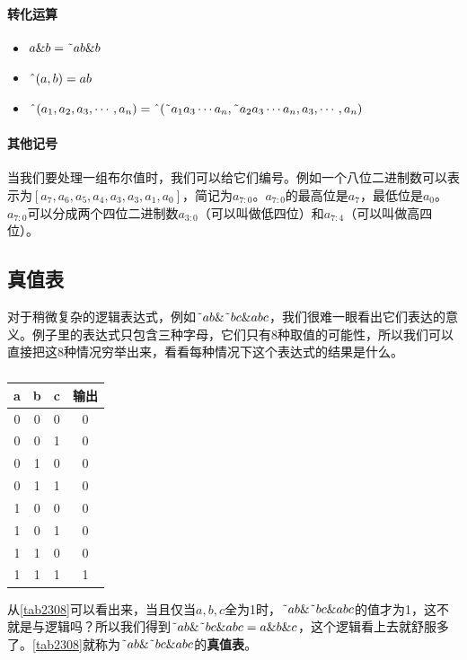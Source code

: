 \paragraph*{转化运算}
\begin{itemize}
\item $a\&b=\textrm{\~{}} ab\&b$
\item $\textrm{\^{}}(a,b)=ab$
\item $\textrm{\^{}}(a_1,a_2,a_3,\cdots,a_n)=\textrm{\^{}}(\textrm{\~{}} a_1a_3\cdots a_n,\textrm{\~{}} a_2a_3\cdots a_n,a_3,\cdots,a_n)$
\end{itemize}

\paragraph*{其他记号}
当我们要处理一组布尔值时，我们可以给它们编号。例如一个八位二进制数可以表示为$[a_7,a_6,a_5,a_4,a_3,a_3,a_1,a_0]$，简记为$a_{7:0}$。$a_{7:0}$的最高位是$a_7$，最低位是$a_0$。$a_{7:0}$可以分成两个四位二进制数$a_{3:0}$（可以叫做低四位）和$a_{7:4}$（可以叫做高四位）。

\subsection{真值表}
对于稍微复杂的逻辑表达式，例如$\textrm{\~{}}ab\&\textrm{\~{}}bc\&abc$，我们很难一眼看出它们表达的意义。例子里的表达式只包含三种字母，它们只有8种取值的可能性，所以我们可以直接把这8种情况穷举出来，看看每种情况下这个表达式的结果是什么。

\begin{table}[!h]
\centering
\begin{tabular}{cccc}
a&b&c&输出\\\hline
0&0&0&0\\\hline
0&0&1&0\\\hline
0&1&0&0\\\hline
0&1&1&0\\\hline
1&0&0&0\\\hline
1&0&1&0\\\hline
1&1&0&0\\\hline
1&1&1&1
\end{tabular}
\caption{}\label{tab2308}
\end{table}

从\autoref{tab2308}可以看出来，当且仅当$a,b,c$全为1时，$\textrm{\~{}}ab\&\textrm{\~{}}bc\&abc$的值才为1，这不就是与逻辑吗？所以我们得到$\textrm{\~{}}ab\&\textrm{\~{}}bc\&abc=a\&b\&c$，这个逻辑看上去就舒服多了。\autoref{tab2308}就称为$\textrm{\~{}}ab\&\textrm{\~{}}bc\&abc$的\textbf{真值表}。


